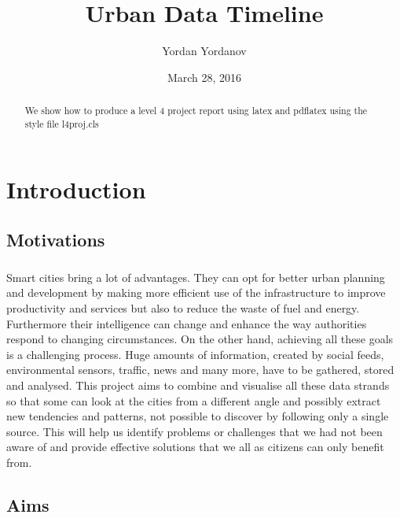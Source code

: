 \documentclass{l4proj}
\begin{document}
\title{Urban Data Timeline}
\author{Yordan Yordanov}
\date{March 28, 2016}
\maketitle

\begin{abstract}
We show how to produce a level 4 project report using latex and pdflatex using the 
style file l4proj.cls
\end{abstract}

\educationalconsent
%
%
\tableofcontents

\chapter{Introduction}

\section{Motivations}
\paragraph{}
Smart cities bring a lot of advantages. They can opt for better urban planning and development by making more efficient use of the infrastructure to improve productivity and services but also to reduce the waste of fuel and energy. Furthermore their intelligence can change and enhance the way authorities respond to changing circumstances. On the other hand, achieving all these goals is a challenging process. Huge amounts of information, created by social feeds, environmental sensors, traffic, news and many more, have to be gathered, stored and analysed. This project aims to combine and visualise all these data strands so that some can look at the cities from a different angle and possibly extract new tendencies and patterns, not possible to discover by following only a single source. This will help us identify problems or challenges that we had not been aware of and provide effective solutions that we all as citizens can only benefit from.

\section{Aims}
\end{document}
